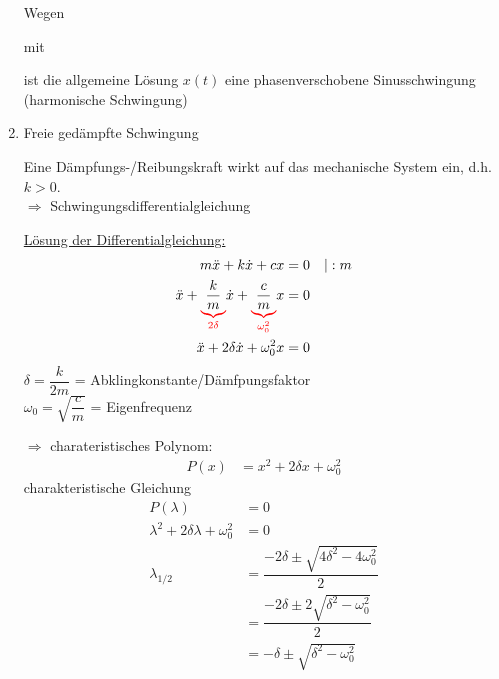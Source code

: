 \begin{enumerate}[A]
	Wegen
	
	
	mit
	
	
	ist die allgemeine Lösung $x(t)$ eine phasenverschobene Sinusschwingung (harmonische Schwingung)
	\imgplaceholder
	
	\item Freie gedämpfte Schwingung
	
	Eine Dämpfungs-/Reibungskraft wirkt auf das mechanische System ein, d.h. $k>0$.\\
	$\Rightarrow$ Schwingungsdifferentialgleichung\\
	\hhspace{2cm}
	
	\ul{Lösung der Differentialgleichung:}
	\begin{align*}
	m\ddot{x}+k\dot{x}+cx&=0&|:m\\
	\ddot{x}+\redunderbrace{\dfrac{k}{m}}{2\delta}\dot{x}+\redunderbrace{\dfrac{c}{m}}{\omega_0^2}x&=0\\
	\ddot{x}+2\delta\dot{x}+\omega_0^2x&=0
	\end{align*}
	$\delta=\dfrac{k}{2m}$ = Abklingkonstante/Dämfpungsfaktor\\
	$\omega_0=\sqrt{\dfrac{c}{m}}$ = Eigenfrequenz
	
	$\Rightarrow$ charateristisches Polynom:
	\begin{align*}
	P(x)&=x^2+2\delta x+\omega_0^2
	\end{align*}
	charakteristische Gleichung
	\begin{align*}
	P(\lambda)&=0\\
	\lambda^2+2\delta\lambda+\omega_0^2&=0\\
	\lambda_{1/2}&=\dfrac{-2\delta\pm\sqrt{4\delta^2-4\omega_0^2}}{2}\\
	&=\dfrac{-2\delta\pm2\sqrt{\delta^2-\omega_0^2}}{2}\\
	&=-\delta\pm\sqrt{\delta^2-\omega_0^2}
	\end{align*}
	

\end{enumerate}
